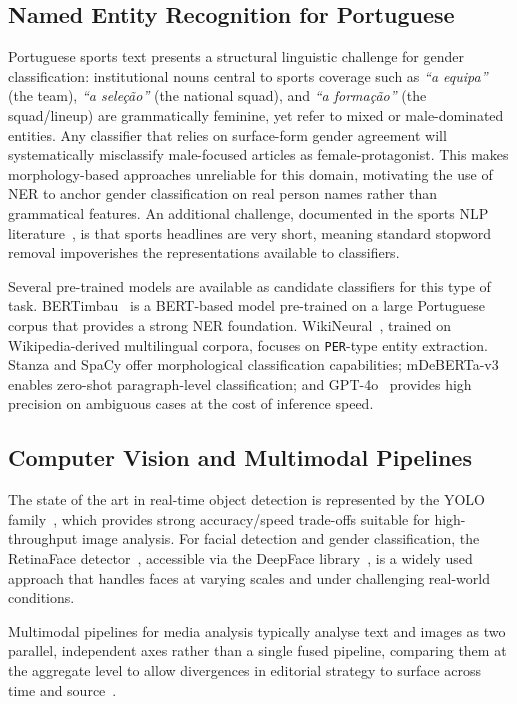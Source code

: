 \documentclass[11pt,a4paper]{article}
\begin{document}
\subsection{Named Entity Recognition for Portuguese}

Portuguese sports text presents a structural linguistic challenge for gender classification: institutional nouns central to sports coverage such as \textit{``a equipa''} (the team), \textit{``a seleção''} (the national squad), and \textit{``a formação''} (the squad/lineup) are grammatically feminine, yet refer to mixed or male-dominated entities. Any classifier that relies on surface-form gender agreement will systematically misclassify male-focused articles as female-protagonist. This makes morphology-based approaches unreliable for this domain, motivating the use of NER to anchor gender classification on real person names rather than grammatical features. An additional challenge, documented in the sports NLP literature~\cite{Rocha2023}, is that sports headlines are very short, meaning standard stopword removal impoverishes the representations available to classifiers.

Several pre-trained models are available as candidate classifiers for this type of task. BERTimbau~\cite{Souza2020} is a BERT-based model pre-trained on a large Portuguese corpus that provides a strong NER foundation. WikiNeural~\cite{Tedeschi2021}, trained on Wikipedia-derived multilingual corpora, focuses on \texttt{PER}-type entity extraction. Stanza and SpaCy offer morphological classification capabilities; mDeBERTa-v3 enables zero-shot paragraph-level classification; and GPT-4o~\cite{OpenAI2024} provides high precision on ambiguous cases at the cost of inference speed.

\subsection{Computer Vision and Multimodal Pipelines}

The state of the art in real-time object detection is represented by the YOLO family~\cite{Ultralytics2023}, which provides strong accuracy/speed trade-offs suitable for high-throughput image analysis. For facial detection and gender classification, the RetinaFace detector~\cite{Deng2020}, accessible via the DeepFace library~\cite{Serengil2020}, is a widely used approach that handles faces at varying scales and under challenging real-world conditions.

Multimodal pipelines for media analysis typically analyse text and images as two parallel, independent axes rather than a single fused pipeline, comparing them at the aggregate level to allow divergences in editorial strategy to surface across time and source~\cite{Guilbeault2025}.
\end{document}
